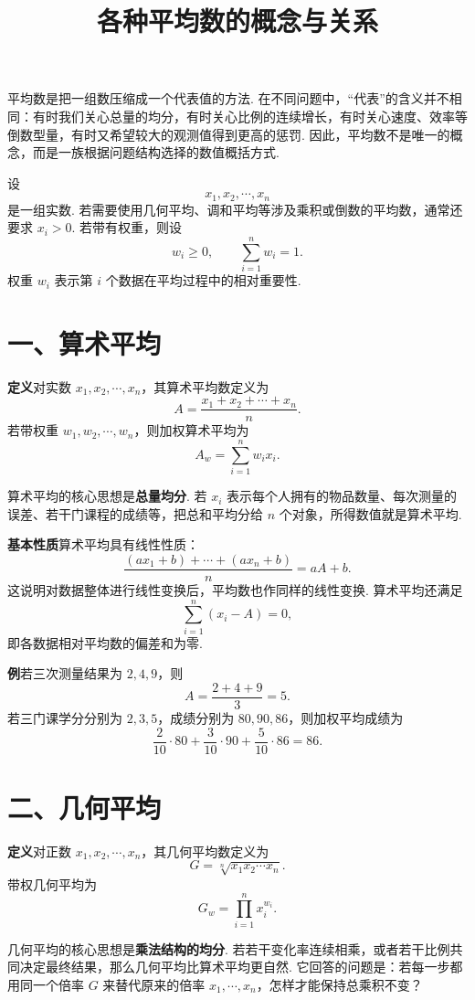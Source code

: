\documentclass[UTF8, 12pt, fontset=fandol, oneside]{ctexart}
\title{各种平均数的概念与关系}
\author{}
\date{}
\begin{document}
\maketitle

平均数是把一组数压缩成一个代表值的方法. 在不同问题中，``代表''的含义并不相同：有时我们关心总量的均分，有时关心比例的连续增长，有时关心速度、效率等倒数型量，有时又希望较大的观测值得到更高的惩罚. 因此，平均数不是唯一的概念，而是一族根据问题结构选择的数值概括方式.

设
\[
  x_1,x_2,\cdots,x_n
\]
是一组实数. 若需要使用几何平均、调和平均等涉及乘积或倒数的平均数，通常还要求 $x_i>0$. 若带有权重，则设
\[
  w_i\ge0,\qquad \sum_{i=1}^n w_i=1.
\]
权重 $w_i$ 表示第 $i$ 个数据在平均过程中的相对重要性.

\section*{一、算术平均}

\noindent\textbf{定义}\quad 对实数 $x_1,x_2,\cdots,x_n$，其算术平均数定义为
\[
  A=\frac{x_1+x_2+\cdots+x_n}{n}.
\]
若带权重 $w_1,w_2,\cdots,w_n$，则加权算术平均为
\[
  A_w=\sum_{i=1}^n w_i x_i.
\]

算术平均的核心思想是\textbf{总量均分}. 若 $x_i$ 表示每个人拥有的物品数量、每次测量的误差、若干门课程的成绩等，把总和平均分给 $n$ 个对象，所得数值就是算术平均.

\noindent\textbf{基本性质}\quad 算术平均具有线性性质：
\[
  \frac{(ax_1+b)+\cdots+(ax_n+b)}{n}
  =aA+b.
\]
这说明对数据整体进行线性变换后，平均数也作同样的线性变换. 算术平均还满足
\[
  \sum_{i=1}^n (x_i-A)=0,
\]
即各数据相对平均数的偏差和为零.

\noindent\textbf{例}\quad 若三次测量结果为 $2,4,9$，则
\[
  A=\frac{2+4+9}{3}=5.
\]
若三门课学分分别为 $2,3,5$，成绩分别为 $80,90,86$，则加权平均成绩为
\[
  \frac{2}{10}\cdot80+\frac{3}{10}\cdot90+\frac{5}{10}\cdot86=86.
\]

\section*{二、几何平均}

\noindent\textbf{定义}\quad 对正数 $x_1,x_2,\cdots,x_n$，其几何平均数定义为
\[
  G=\sqrt[n]{x_1x_2\cdots x_n}.
\]
带权几何平均为
\[
  G_w=\prod_{i=1}^n x_i^{w_i}.
\]

几何平均的核心思想是\textbf{乘法结构的均分}. 若若干变化率连续相乘，或者若干比例共同决定最终结果，那么几何平均比算术平均更自然. 它回答的问题是：若每一步都用同一个倍率 $G$ 来替代原来的倍率 $x_1,\cdots,x_n$，怎样才能保持总乘积不变？
\end{document}
